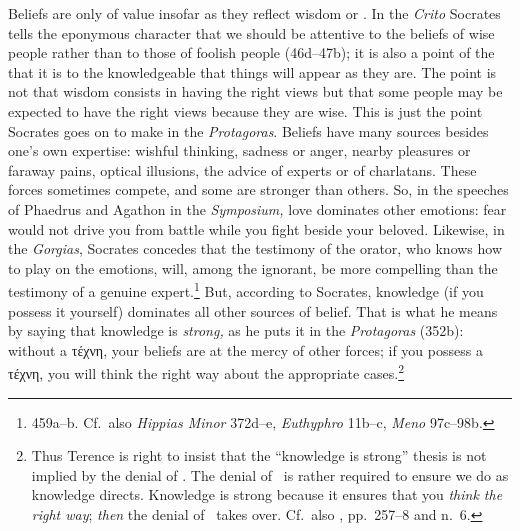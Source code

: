 \documentclass[11pt,letterpaper,oneside]{amsart} %
\begin{document}


Beliefs are only of value insofar as they reflect wisdom or \techne. In the \emph{Crito} Socrates tells the eponymous character that we should be attentive to the beliefs of wise people rather than to those of foolish people (46d--47b); it is also a point of the  that it is to the knowledgeable that things will appear as they are. The point is not that wisdom consists in having the right views but that some people may be expected to have the right views because they are wise. This is just the point Socrates goes on to make in the \emph{Protagoras}. Beliefs have many sources besides one's own expertise: wishful thinking, sadness or anger, nearby pleasures or faraway pains, optical illusions, the advice of experts or of charlatans. These forces sometimes compete, and some are stronger than others. So, in the speeches of Phaedrus and Agathon in the \emph{Symposium,} love dominates other emotions: fear would not drive you from battle while you fight beside your beloved. Likewise, in the \emph{Gorgias}, Socrates concedes that the testimony of the orator, who knows how to play on the emotions, will, among the ignorant, be more compelling than the testimony of a genuine expert.\footnote{459a--b. Cf.\ also \emph{Hippias Minor} 372d--e, \emph{Euthyphro} 11b--c, \emph{Meno} 97c--98b.} But, according to Socrates, knowledge (if you possess it yourself) dominates all other sources of belief. That is what he means by saying that knowledge is \emph{strong,} as he puts it in the \emph{Protagoras} (352b): without a τέχνη, your beliefs are at the mercy of other forces; if you possess a τέχνη, you will think the right way about the appropriate cases.\footnote{Thus Terence \citet{penner1997ssk} is right to insist that the ``knowledge is strong'' thesis is not implied by the denial of \akrasia. The denial of \akrasia\ is rather required to ensure we do as knowledge directs. Knowledge is strong because it ensures that you \emph{think the right way}; \emph{then} the denial of \akrasia\ takes over. Cf.\ also \citet{allen1960sp}, pp.\ 257--8 and n.\ 6.}
\end{document}
